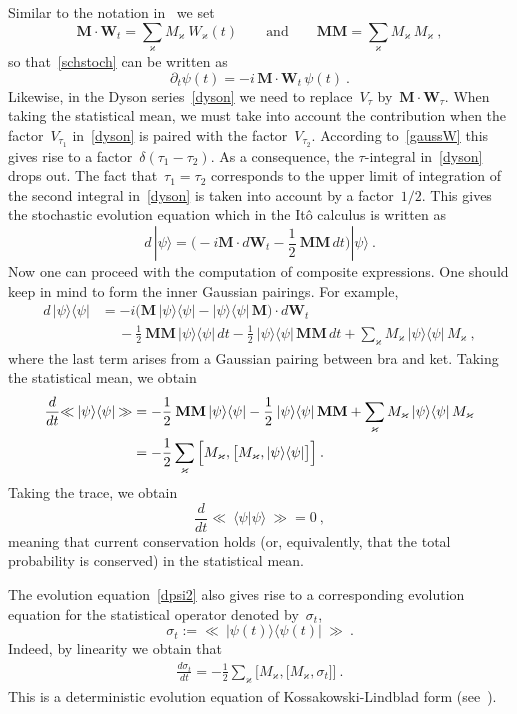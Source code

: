\documentclass[reqno,11pt]{amsart}
\numberwithin{equation}{section}
\newcommand{\la}{\langle}
\newcommand{\ra}{\rangle}
\newcommand{\bbra}{\mathopen{\ll}}
\newcommand{\kket}{\mathclose{\gg}}
\newcommand{\1}{\mathds{1}}
\newcommand{\bM}{\mathbf{M}}
\newcommand{\bW}{\mathbf{W}}
\begin{document}
Similar to the notation in~\cite{bassi-ghirardi} we set
\[ %
\bM \cdot \bW_t = \sum_\varkappa M_\varkappa\: W_\varkappa(t) \qquad \text{and} \qquad
\bM \bM = \sum_{\varkappa} M_\varkappa\, M_\varkappa \:, \]
so that~\eqref{schstoch} can be written as
\[ \partial_t \psi(t) = -i \,\bM \cdot \bW_t \, \psi(t) \:. \]
Likewise, in the Dyson series~\eqref{dyson} we need to replace~$V_{\tau}$ by~$\bM \cdot \bW_\tau$.
When taking the statistical mean, we must take into account the contribution when the factor~$V_{\tau_1}$
in~\eqref{dyson} is paired with the factor~$V_{\tau_2}$. According to~\eqref{gaussW} this
gives rise to a factor~$\delta(\tau_1-\tau_2)$. As a consequence, the $\tau$-integral in~\eqref{dyson}
drops out. The fact that~$\tau_1=\tau_2$ corresponds to the upper limit of integration
of the second integral in~\eqref{dyson} is taken into account by a factor~$1/2$.
This gives the stochastic evolution equation which in the It\^o calculus is written as
\[ %
d\,|\psi \ra = \Big( - i \bM \cdot d\bW_t - \frac{1}{2}\: \bM \bM \,dt \Big) |\psi \ra \:. \]
Now one can proceed with the computation of composite expressions. One should keep in mind
to form the inner Gaussian pairings. For example,
\begin{align}
d\, |\psi \ra \la \psi| &= 
-i \big(  \bM \,  |\psi \ra \la \psi| -  |\psi \ra \la \psi|\, \bM \big) \cdot d\bW_t \label{t21} \\
&\quad\: -\frac{1}{2}\: \bM \bM\, |\psi \ra \la \psi|\,dt -\frac{1}{2}\: |\psi \ra \la \psi|\,\bM \bM\,dt
+ \sum_{\varkappa} M_\varkappa \,|\psi \ra \la \psi|\, M_\varkappa \:, \label{t2}
\end{align}
where the last term arises from a Gaussian pairing between bra and ket.
Taking the statistical mean, we obtain
\begin{align}
\frac{d}{dt} \bbra\: |\psi \ra \la \psi | \:\kket &=
-\frac{1}{2}\: \bM \bM\, |\psi \ra \la \psi| -\frac{1}{2}\: |\psi \ra \la \psi|\,\bM \bM
+ \sum_{\varkappa} M_\varkappa \,|\psi \ra \la \psi|\, M_\varkappa \notag \\
&=-\frac{1}{2} \sum_{\varkappa} 
\Big[ M_\varkappa, \big[ M_\varkappa,  |\psi \ra \la \psi| \big] \Big] \:. \label{dpsi2}
\end{align}
Taking the trace, we obtain
\[ \frac{d}{dt} \bbra\: \la \psi | \psi \ra \:\kket = 0 \:, \]
meaning that current conservation holds (or, equivalently, that the total probability is conserved)
in the statistical mean.

The evolution equation~\eqref{dpsi2} also gives rise to a corresponding
evolution equation for the statistical operator denoted by~$\sigma_t$,
\[ %
\sigma_t := \bbra \:\big| \psi(t) \big\ra \big\la \psi(t) \big| \:\kket \:. \]
Indeed, by linearity we obtain that
\begin{align*}
\frac{d \sigma_t}{dt} =- \frac{1}{2} \sum_{\varkappa} \Big[ M_\varkappa, \big[ M_\varkappa,  \sigma_t \big] \Big] \:.
\end{align*}
This is a deterministic evolution equation of Kossakowski-Lindblad form
(see~\cite{kossakowski,lindblad}).
\end{document}
